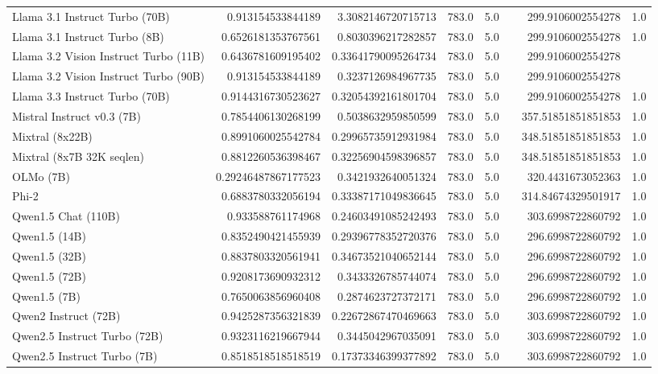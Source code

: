 \begin{table}[htp]
{\begin{tabular}{lrrrrrrr}
Llama 3.1 Instruct Turbo (70B) & 0.913154533844189 & 3.3082146720715713 & 783.0 & 5.0 &  & 299.9106002554278 & 1.0 \\
Llama 3.1 Instruct Turbo (8B) & 0.6526181353767561 & 0.8030396217282857 & 783.0 & 5.0 &  & 299.9106002554278 & 1.0 \\
Llama 3.2 Vision Instruct Turbo (11B) & 0.6436781609195402 & 0.33641790095264734 & 783.0 & 5.0 &  & 299.9106002554278 &  \\
Llama 3.2 Vision Instruct Turbo (90B) & 0.913154533844189 & 0.3237126984967735 & 783.0 & 5.0 &  & 299.9106002554278 &  \\
Llama 3.3 Instruct Turbo (70B) & 0.9144316730523627 & 0.32054392161801704 & 783.0 & 5.0 &  & 299.9106002554278 & 1.0 \\
Mistral Instruct v0.3 (7B) & 0.7854406130268199 & 0.5038632959850599 & 783.0 & 5.0 &  & 357.51851851851853 & 1.0 \\
Mixtral (8x22B) & 0.8991060025542784 & 0.29965735912931984 & 783.0 & 5.0 &  & 348.51851851851853 & 1.0 \\
Mixtral (8x7B 32K seqlen) & 0.8812260536398467 & 0.32256904598396857 & 783.0 & 5.0 &  & 348.51851851851853 & 1.0 \\
OLMo (7B) & 0.29246487867177523 & 0.3421932640051324 & 783.0 & 5.0 &  & 320.4431673052363 & 1.0 \\
Phi-2 & 0.6883780332056194 & 0.33387171049836645 & 783.0 & 5.0 &  & 314.84674329501917 & 1.0 \\
Qwen1.5 Chat (110B) & 0.933588761174968 & 0.24603491085242493 & 783.0 & 5.0 &  & 303.6998722860792 & 1.0 \\
Qwen1.5 (14B) & 0.8352490421455939 & 0.29396778352720376 & 783.0 & 5.0 &  & 296.6998722860792 & 1.0 \\
Qwen1.5 (32B) & 0.8837803320561941 & 0.34673521040652144 & 783.0 & 5.0 &  & 296.6998722860792 & 1.0 \\
Qwen1.5 (72B) & 0.9208173690932312 & 0.3433326785744074 & 783.0 & 5.0 &  & 296.6998722860792 & 1.0 \\
Qwen1.5 (7B) & 0.7650063856960408 & 0.2874623727372171 & 783.0 & 5.0 &  & 296.6998722860792 & 1.0 \\
Qwen2 Instruct (72B) & 0.9425287356321839 & 0.22672867470469663 & 783.0 & 5.0 &  & 303.6998722860792 & 1.0 \\
Qwen2.5 Instruct Turbo (72B) & 0.9323116219667944 & 0.3445042967035091 & 783.0 & 5.0 &  & 303.6998722860792 & 1.0 \\
Qwen2.5 Instruct Turbo (7B) & 0.8518518518518519 & 0.17373346399377892 & 783.0 & 5.0 &  & 303.6998722860792 & 1.0 \\

\end{tabular}}
\end{table}
